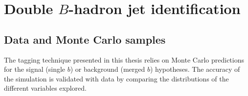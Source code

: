 %
%
\chapter{Double $B$-hadron jet identification}\label{chap:kinematic}




\section{Data and Monte Carlo samples}\label{sec:Simulation}


The tagging technique presented in this thesis relies on Monte Carlo predictions for the signal (single $b$) or background (merged $b$) hypotheses. The accuracy of the simulation is validated with data by comparing the distributions of the different variables explored.

